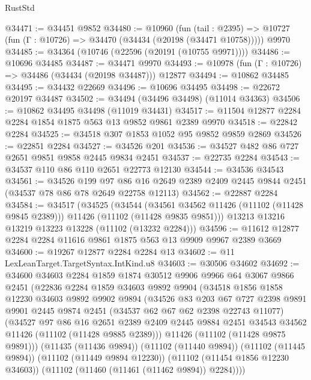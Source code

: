 \begin{lexlean}{RustStd}
\begin{coremodule}
@34471 := @34451 @9852
@34480 := @10960
    (fun (tail : @2395) => @10727 (fun (Γ : @10726) => @34470 (@34434 (@20198 (@34471 @10758)))))
    @9970
@34485 := @34364 (@10746 (@22596 (@20191 (@10755 @9971))))
@34486 := @10696 @34485
@34487 := @34471 @9970
@34493 := @10978 (fun (Γ : @10726) => @34486 (@34434 (@20198 @34487))) @12877
@34494 := @10862 @34485
@34495 := @34432 @22669
@34496 := @10696 @34495
@34498 := @22672 @20197 @34487
@34502 := @34494 (@34496 @34498) (@11014 @34363)
@34506 := @10862 @34495 @34498 (@11019 @34431)
@34517 := @11504 @12877 @2284 @2284 @1854 @1875 @563 @13 @9852 @9861 @2389 @9970
@34518 := @22842 @2284
@34525 := @34518 @307 @1853 @1052 @95 @9852 @9859 @2869
@34526 := @22851 @2284
@34527 := @34526 @201
@34536 := @34527 @482 @86 @727 @2651 @9851 @9858 @2445 @9834 @2451
@34537 := @22735 @2284
@34543 := @34537 @110 @86 @110 @2651 @22773 @12130
@34544 := @34536 @34543
@34561 := @34526
    @199
    @97
    @86
    @16
    @2649
    @2389
    @2409
    @2445
    @9844
    @2451
    (@34537 @78 @86 @78 @2649 @22758 @12113)
@34562 := @22887 @2284
@34584 := @34517
    (@34525
      (@34544
        (@34561 @34562 @11426 (@11102 (@11428 @9845 @2389)))
        @11426
        (@11102 (@11428 @9835 @9851)))
      @13213
      @13216
      @13219
      @13223
      @13228
      (@11102 (@13232 @2284)))
@34596 := @11612 @12877 @2284 @2284 @11616 @9861 @1875 @563 @13 @9909 @9967 @2389 @3669
@34600 := @19267 @12877 @2284 @2284 @13
@34602 := @11 LexLeanTarget.TargetSyntax.IntKind.u8
@34603 := @30506 @34602
@34692 := @34600
    @34603
    @2284
    @1859
    @1874
    @30512
    @9906
    @9966
    @64
    @3067
    @9866
    @2451
    (@22836
      @2284
      @1859
      @34603
      @9892
      @9904
      (@34518
        @1856
        @1858
        @12230
        @34603
        @9892
        @9902
        @9894
        (@34526
          @83
          @203
          @67
          @727
          @2398
          @9891
          @9901
          @2445
          @9874
          @2451
          (@34537 @62 @67 @62 @2398 @22743 @11077)
          (@34527
            @97
            @86
            @16
            @2651
            @2389
            @2409
            @2445
            @9884
            @2451
            @34543
            @34562
            @11426
            (@11102 (@11428 @9885 @2389)))
          @11426
          (@11102 (@11428 @9875 @9891)))
        (@11435 (@11436 @9894))
        (@11102 (@11440 @9894))
        (@11102 (@11445 @9894))
        (@11102 (@11449 @9894 @12230))
        (@11102 (@11454 @1856 @12230 @34603))
        (@11102 (@11460 (@11461 (@11462 @9894)) @2284))))

\end{coremodule}
\end{lexlean}
